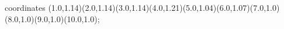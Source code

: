 					coordinates { (1.0,1.14)(2.0,1.14)(3.0,1.14)(4.0,1.21)(5.0,1.04)(6.0,1.07)(7.0,1.0)(8.0,1.0)(9.0,1.0)(10.0,1.0)};